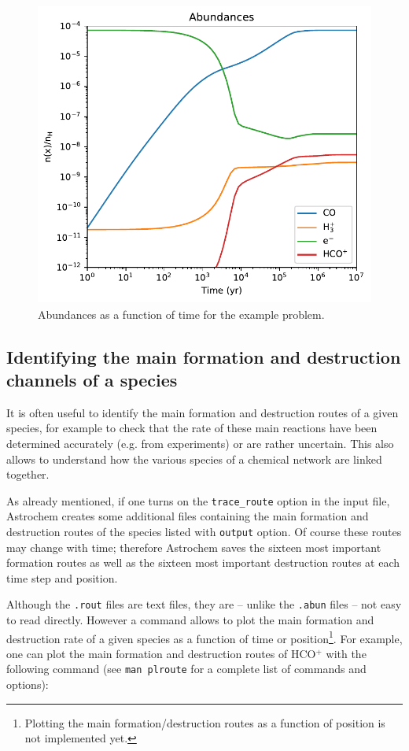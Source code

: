 \documentclass[a4paper,12pt]{article}
\begin{document}
\begin{figure}
  \begin{center}
    \includegraphics[height=10cm]{fig1.pdf}
  \end{center}
  \caption{Abundances as a function of time for the example problem.}
  \label{fig:example-abundances}
\end{figure}

\subsection{Identifying the main formation and destruction channels of
   a species}
\label{sec:ident-main-form}

It is often useful to identify the main formation and destruction
routes of a given species, for example to check that the rate of these
main reactions have been determined accurately (e.g. from experiments)
or are rather uncertain. This also allows to understand how the
various species of a chemical network are linked together.

As already mentioned, if one turns on the \verb=trace_route= option
in the input file, Astrochem creates some additional files containing
the main formation and destruction routes of the species listed with
\verb=output= option. Of course these routes may change with time;
therefore Astrochem saves the sixteen most important formation routes
as well as the sixteen most important destruction routes at each time
step and position.

Although the \verb=.rout= files are text files, they are -- unlike
the \verb=.abun= files -- not easy to read directly. However a command
allows to plot the main formation and destruction rate of a given
species as a function of time or position\footnote{Plotting the main
  formation/destruction routes as a function of position is not
  implemented yet.}. For example, one can plot the main formation and
destruction routes of HCO$^{+}$ with the following command (see
\verb=man plroute= for a complete list of commands and options):
\end{document}
